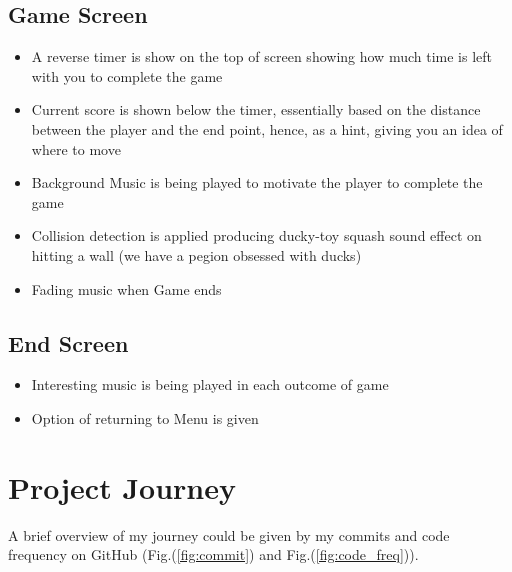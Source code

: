 \documentclass{article}
\begin{document}
\subsection{Game Screen}
\begin{itemize}
    \item A reverse timer is show on the top of screen showing how much time is left with you to complete the game
    \item Current score is shown below the timer, essentially based on the distance between the player and the end point, hence, as a hint, giving you an idea of where to move
    \item Background Music is being played to motivate the player to complete the game
    \item Collision detection is applied producing ducky-toy squash sound effect on hitting a wall (we have a pegion obsessed with ducks)
    \item Fading music when Game ends
\end{itemize}
\subsection{End Screen}
\begin{itemize}
    \item Interesting music is being played in each outcome of game
    \item Option of returning to Menu is given
\end{itemize}
\section{Project Journey}
A brief overview of my journey could be given by my commits and code frequency on GitHub (Fig.(\ref{fig:commit}) and Fig.(\ref{fig:code_freq})).
\end{document}
